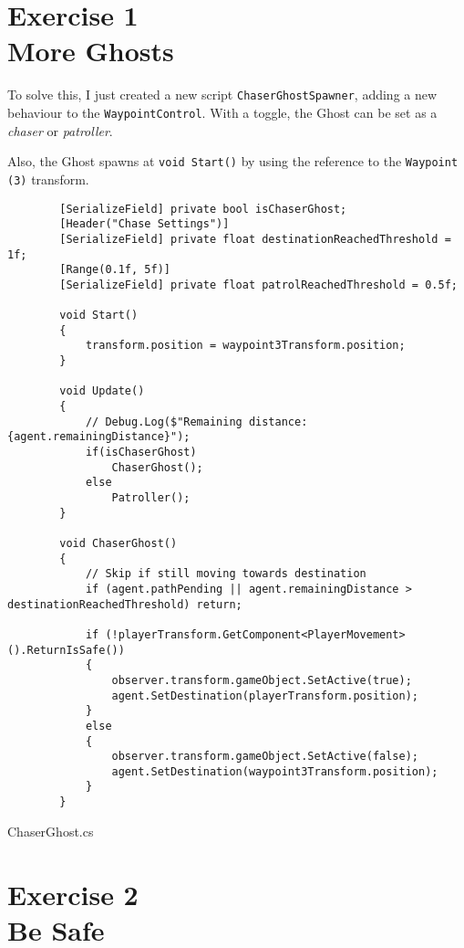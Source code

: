 \section[Exersice 1. More Ghosts]{Exercise 1\\ {\large More Ghosts}}

    To solve this, I just created a new script \texttt{ChaserGhostSpawner}, adding a new behaviour to the \texttt{WaypointControl}. With a toggle, the Ghost can be set as a \textit{chaser} or \textit{patroller}.

    Also, the Ghost spawns at  \texttt{void Start()} by using the reference to the \texttt{Waypoint (3)} transform.
    \begin{listing}[htbp]
    \begin{verbatim}
        [SerializeField] private bool isChaserGhost;
        [Header("Chase Settings")]
        [SerializeField] private float destinationReachedThreshold = 1f;
        [Range(0.1f, 5f)]
        [SerializeField] private float patrolReachedThreshold = 0.5f;

        void Start()
        {
            transform.position = waypoint3Transform.position;
        }

        void Update()
        {
            // Debug.Log($"Remaining distance: {agent.remainingDistance}");
            if(isChaserGhost)
                ChaserGhost();
            else
                Patroller();
        }

        void ChaserGhost()
        {
            // Skip if still moving towards destination
            if (agent.pathPending || agent.remainingDistance > destinationReachedThreshold) return;

            if (!playerTransform.GetComponent<PlayerMovement>().ReturnIsSafe())
            {
                observer.transform.gameObject.SetActive(true);
                agent.SetDestination(playerTransform.position);
            }
            else
            {
                observer.transform.gameObject.SetActive(false);
                agent.SetDestination(waypoint3Transform.position);
            }
        }
    \end{verbatim}
    \caption{ChaserGhost.cs}
    \label{lst:chaserghost}
    \end{listing}

\newpage
\section[Exersice 2. Be Safe]{Exercise 2\\ {\large Be Safe}}

